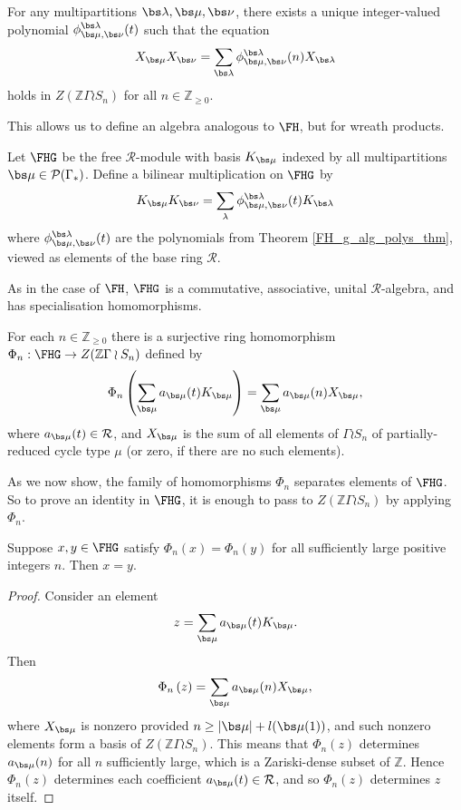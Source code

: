 \begin{theorem} \label{FH_g_alg_polys_thm}
For any multipartitions $\bs \lambda, \bs\mu, \bs\nu$, there exists a unique integer-valued polynomial $\phi_{\bs\mu, \bs\nu}^{\bs\lambda}(t)$ such that the equation
\[
X_{\bs\mu} X_{\bs\nu} = \sum_{\bs\lambda} \phi_{\bs\mu, \bs\nu}^{\bs\lambda}(n)X_{\bs\lambda}
\]
holds in $Z(\mathbb{Z} \Gamma \wr S_n)$ for all $n \in \mathbb{Z}_{\geq 0}$.
\end{theorem}
This allows us to define an algebra analogous to $\FH$, but for wreath products.

\begin{definition} 
Let $\FHG$ be the free $\mathcal{R}$-module with basis $K_{\bs \mu}$ indexed by all multipartitions $\bs \mu \in \mathcal{P}(\Gamma_*)$. Define a bilinear multiplication on $\FHG$ by
\[
K_{\bs \mu} K_{\bs \nu} = \sum_{\lambda} \phi_{\bs\mu, \bs\nu}^{\bs\lambda}(t) K_{\bs \lambda}
\]
where $\phi_{\bs\mu, \bs\nu}^{\bs\lambda}(t)$ are the polynomials from Theorem \ref{FH_g_alg_polys_thm}, viewed as elements of the base ring $\mathcal{R}$.
\end{definition}

As in the case of $\FH$, $\FHG$ is a commutative, associative, unital $\mathcal{R}$-algebra, and has specialisation homomorphisms.
\begin{theorem}  \label{thm:FH_g_spec_hom}
For each $n \in \mathbb{Z}_{\geq 0}$ there is a surjective ring homomorphism $\Phi_n: \FHG \to Z(\mathbb{Z}\Gamma \wr S_n)$ defined by
\[
\Phi_n \left( \sum_{\bs \mu} a_{\bs \mu}(t) K_{\bs\mu} \right) = \sum_{\bs \mu} a_{\bs \mu}(n) X_{\bs \mu},
\]
where $a_{\bs\mu}(t) \in \mathcal{R}$, and $X_{\bs\mu}$ is the sum of all elements of $\Gamma \wr S_n$ of partially-reduced cycle type $\mu$ \textup{(}or zero, if there are no such elements\textup{)}.
\end{theorem}

As we now show, the family of homomorphisms $\Phi_n$ separates elements of $\FHG$. So to prove an identity in $\FHG$, it is enough to pass to $Z(\mathbb{Z}\Gamma \wr S_n)$ by applying $\Phi_n$.
\begin{proposition} \label{specialisation_distinguishing_prop}
Suppose $x,y \in \FHG$ satisfy $\Phi_n(x) = \Phi_n(y)$ for all sufficiently large positive integers $n$. Then $x=y$.
\end{proposition}
\begin{proof}
Consider an element
\[
z = \sum_{\bs \mu} a_{\bs \mu}(t) K_{\bs\mu}.
\]
Then
\[
\Phi_n \left(z \right) = \sum_{\bs \mu} a_{\bs \mu}(n) X_{\bs \mu},
\]
where $X_{\bs \mu}$ is nonzero provided $n \geq |\bs \mu| + l(\bs \mu(1))$, and such nonzero elements form a basis of $Z(\mathbb{Z}\Gamma \wr S_n)$. This means that $\Phi_n(z)$ determines $a_{\bs \mu}(n)$ for all $n$ sufficiently large, which is a Zariski-dense subset of $\mathbb{Z}$. Hence $\Phi_n(z)$ determines each coefficient $a_{\bs \mu}(t) \in \mathcal{R}$, and so $\Phi_n(z)$ determines $z$ itself. 
\end{proof}

